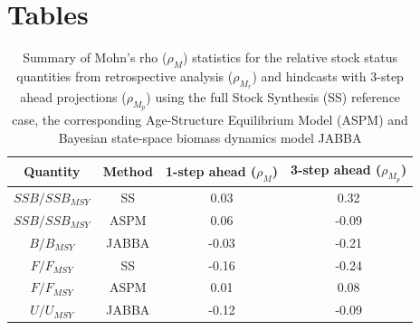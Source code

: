 \documentclass[12pt,halfline,a4paper,nonumbib]{ouparticle}
\begin{document}
\clearpage
\newpage
\section{Tables}


\begin{table}[!ht]
\caption{Summary of Mohn's rho ($\rho_{M}$) statistics for the relative stock status quantities from retrospective analysis ($\rho_{M_r}$) and hindcasts with 3-step ahead projections ($\rho_{M_p}$) using the full Stock Synthesis (SS) reference case, the corresponding Age-Structure Equilibrium Model (ASPM) and Bayesian state-space biomass dynamics model JABBA}  
\begin{center}
\label{tab:retro-rho}
\begin{tabular}{|cccc|}
\hline
{\small Quantity} & \small Method & {\small 1-step ahead ($\rho_{M}$)} & {\small 3-step ahead ($\rho_{M_p}$)} \\ 
\hline\hline
{\small $SSB/SSB_{MSY}$     } & {\small SS} 	 & {\small    0.03} & {\small  0.32}      \\
{\small $SSB/SSB_{MSY}$     } & {\small ASPM} 	 & {\small    0.06} & {\small -0.09}      \\
{\small $B/B_{MSY}$         } & {\small JABBA} 	 & {\small   -0.03} & {\small -0.21}      \\
{\small $F/F_{MSY}$         } & {\small SS} 	 & {\small   -0.16} & {\small -0.24}      \\
{\small $F/F_{MSY}$         } & {\small ASPM} 	 & {\small    0.01} & {\small  0.08}      \\
{\small $U/U_{MSY}$         } & {\small JABBA} 	 & {\small   -0.12} & {\small -0.09}      \\
\hline
\end{tabular}
\end{center}
\end{table}
\end{document}
